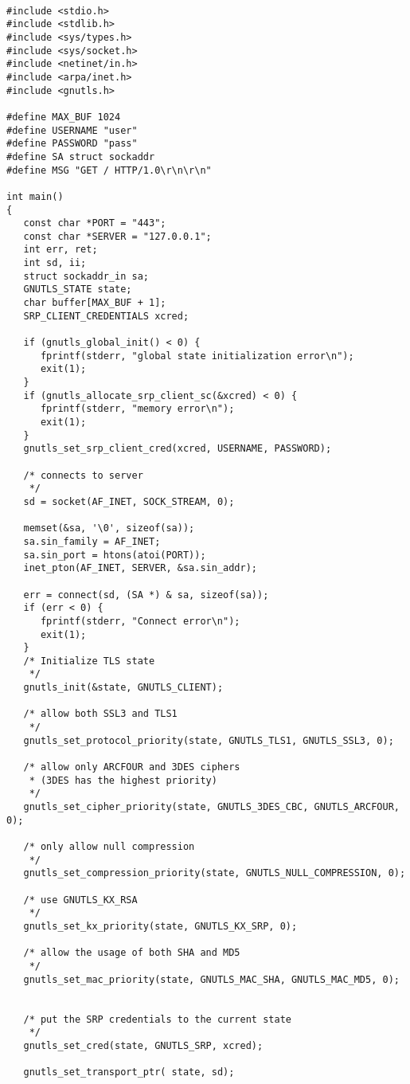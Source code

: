 \begin{verbatim}

#include <stdio.h>
#include <stdlib.h>
#include <sys/types.h>
#include <sys/socket.h>
#include <netinet/in.h>
#include <arpa/inet.h>
#include <gnutls.h>

#define MAX_BUF 1024
#define USERNAME "user"
#define PASSWORD "pass"
#define SA struct sockaddr
#define MSG "GET / HTTP/1.0\r\n\r\n"

int main()
{
   const char *PORT = "443";
   const char *SERVER = "127.0.0.1";
   int err, ret;
   int sd, ii;
   struct sockaddr_in sa;
   GNUTLS_STATE state;
   char buffer[MAX_BUF + 1];
   SRP_CLIENT_CREDENTIALS xcred;

   if (gnutls_global_init() < 0) {
      fprintf(stderr, "global state initialization error\n");
      exit(1);
   }
   if (gnutls_allocate_srp_client_sc(&xcred) < 0) {
      fprintf(stderr, "memory error\n");
      exit(1);
   }
   gnutls_set_srp_client_cred(xcred, USERNAME, PASSWORD);

   /* connects to server 
    */
   sd = socket(AF_INET, SOCK_STREAM, 0);

   memset(&sa, '\0', sizeof(sa));
   sa.sin_family = AF_INET;
   sa.sin_port = htons(atoi(PORT));
   inet_pton(AF_INET, SERVER, &sa.sin_addr);

   err = connect(sd, (SA *) & sa, sizeof(sa));
   if (err < 0) {
      fprintf(stderr, "Connect error\n");
      exit(1);
   }
   /* Initialize TLS state 
    */
   gnutls_init(&state, GNUTLS_CLIENT);

   /* allow both SSL3 and TLS1
    */
   gnutls_set_protocol_priority(state, GNUTLS_TLS1, GNUTLS_SSL3, 0);

   /* allow only ARCFOUR and 3DES ciphers
    * (3DES has the highest priority)
    */
   gnutls_set_cipher_priority(state, GNUTLS_3DES_CBC, GNUTLS_ARCFOUR, 0);

   /* only allow null compression
    */
   gnutls_set_compression_priority(state, GNUTLS_NULL_COMPRESSION, 0);

   /* use GNUTLS_KX_RSA
    */
   gnutls_set_kx_priority(state, GNUTLS_KX_SRP, 0);

   /* allow the usage of both SHA and MD5
    */
   gnutls_set_mac_priority(state, GNUTLS_MAC_SHA, GNUTLS_MAC_MD5, 0);


   /* put the SRP credentials to the current state
    */
   gnutls_set_cred(state, GNUTLS_SRP, xcred);

   gnutls_set_transport_ptr( state, sd);


\end{verbatim}
